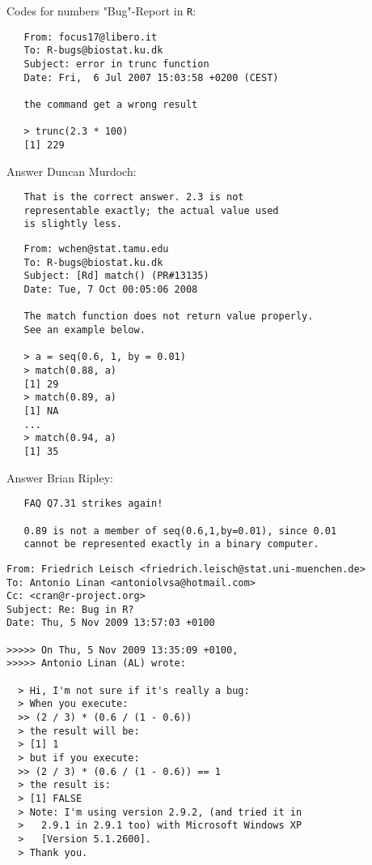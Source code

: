 \documentclass[11pt,compress,t,notes=noshow, xcolor=table]{beamer}
\begin{document}
\begin{vbframe}{Codes for numbers}
"Bug"-Report in \texttt{R}:
\small
\begin{verbatim}
   From: focus17@libero.it
   To: R-bugs@biostat.ku.dk
   Subject: error in trunc function
   Date: Fri,  6 Jul 2007 15:03:58 +0200 (CEST)

   the command get a wrong result

   > trunc(2.3 * 100)
   [1] 229
\end{verbatim}

Answer Duncan Murdoch:
\begin{verbatim}
   That is the correct answer. 2.3 is not
   representable exactly; the actual value used
   is slightly less.
\end{verbatim}

\framebreak

\small
\begin{verbatim}
   From: wchen@stat.tamu.edu
   To: R-bugs@biostat.ku.dk
   Subject: [Rd] match() (PR#13135)
   Date: Tue, 7 Oct 00:05:06 2008

   The match function does not return value properly.
   See an example below.

   > a = seq(0.6, 1, by = 0.01)
   > match(0.88, a)
   [1] 29
   > match(0.89, a)
   [1] NA
   ...
   > match(0.94, a)
   [1] 35
\end{verbatim}

\framebreak 

Answer Brian Ripley:
\begin{verbatim}
   FAQ Q7.31 strikes again!

   0.89 is not a member of seq(0.6,1,by=0.01), since 0.01
   cannot be represented exactly in a binary computer.
\end{verbatim}


\framebreak

\small
\begin{verbatim}
From: Friedrich Leisch <friedrich.leisch@stat.uni-muenchen.de>
To: Antonio Linan <antoniolvsa@hotmail.com>
Cc: <cran@r-project.org>
Subject: Re: Bug in R?
Date: Thu, 5 Nov 2009 13:57:03 +0100

>>>>> On Thu, 5 Nov 2009 13:35:09 +0100,
>>>>> Antonio Linan (AL) wrote:

  > Hi, I'm not sure if it's really a bug:
  > When you execute:
  >> (2 / 3) * (0.6 / (1 - 0.6))
  > the result will be:
  > [1] 1
  > but if you execute:
  >> (2 / 3) * (0.6 / (1 - 0.6)) == 1
  > the result is:
  > [1] FALSE
  > Note: I'm using version 2.9.2, (and tried it in
  >   2.9.1 in 2.9.1 too) with Microsoft Windows XP
  >   [Version 5.1.2600].
  > Thank you.


\end{verbatim}
\end{vbframe}
\end{document}
